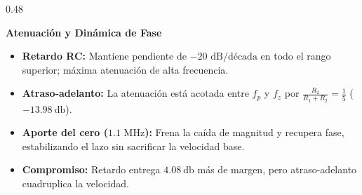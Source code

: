 \documentclass[aspectratio=169, 10pt]{beamer}
\begin{document}
\begin{frame}
\begin{columns}[t, onlytextwidth]
    \begin{column}{0.48\textwidth}
      \begin{tarjeta}
        {\fontsize{9pt}{11pt}\selectfont \textbf{\color{NavyDark} Atenuación y Dinámica de Fase}}\\[2pt]
        {\fontsize{8pt}{10pt}\selectfont
        \begin{itemize}\setlength{\itemsep}{2.5pt}
          \item \textbf{Retardo RC:}
          Mantiene pendiente de $-20\text{ dB/década}$ en todo el rango superior; máxima atenuación de alta frecuencia.
          \item \textbf{Atraso-adelanto:}
          La atenuación está acotada entre $f_p$ y $f_z$ por $\frac{R_2}{R_1+R_2} = \frac{1}{5}$ ($\qty{-13.98}{\decibel}$).
          \item \textbf{Aporte del cero ($1.1\text{ MHz}$):}
          Frena la caída de magnitud y recupera fase, estabilizando el lazo sin sacrificar la velocidad base.
          \item \textbf{Compromiso:} Retardo entrega $\qty{4.08}{\decibel}$ más de margen, pero atraso-adelanto cuadruplica la velocidad.
        \end{itemize}
        }
      \end{tarjeta}
    \end{column}
  \end{columns}
\end{frame}

\end{document}
